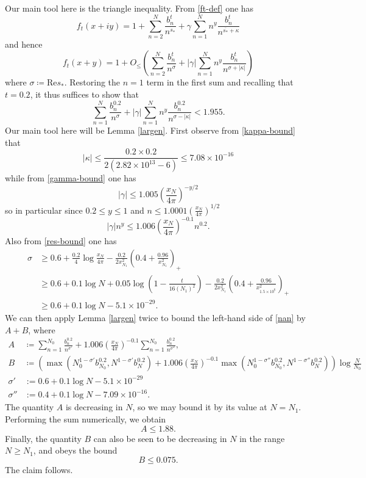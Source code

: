 Our main tool here is the triangle inequality.  From \eqref{ft-def} one has
$$
f_t(x+iy) = 1 + \sum_{n=2}^N \frac{b_n^t}{n^{s_*}} + \gamma \sum_{n=1}^N n^y \frac{b_n^t}{n^{\overline{s_*} + \kappa}}$$
and hence
$$ f_t(x+y) = 1 + O_{\leq}( \sum_{n=2}^N \frac{b_n^t}{n^{\sigma}} + |\gamma| \sum_{n=1}^N n^y \frac{b_n^t}{n^{\sigma + |\kappa|}} )$$
where $\sigma \coloneqq \mathrm{Re} s_*$.  Restoring the $n=1$ term in the first sum and recalling that $t=0.2$, it thus suffices to show that
\begin{equation}\label{nan}
 \sum_{n=1}^N \frac{b_n^{0.2}}{n^\sigma} + |\gamma| \sum_{n=1}^N n^y \frac{b_n^{0.2}}{n^{\sigma-|\kappa|}}
< 1.955.
\end{equation}
Our main tool here will be Lemma \ref{largen}.  First observe from \eqref{kappa-bound} that
$$ |\kappa| \leq \frac{0.2 \times 0.2}{2(2.82 \times 10^{13}-6)} \leq 7.08 \times 10^{-16}$$
while from \eqref{gamma-bound} one has
$$
|\gamma| \leq 1.005 \left( \frac{x_N}{4\pi} \right)^{-y/2}$$
so in particular since $0.2 \leq y \leq 1$ and $n \leq 1.0001 (\frac{x_N}{4\pi})^{1/2}$
$$
|\gamma| n^y \leq 1.006 \left( \frac{x_N}{4\pi} \right)^{-0.1} n^{0.2}.$$
Also from \eqref{res-bound} one has
\begin{align*}
\sigma &\geq 0.6 + \frac{0.2}{4} \log \frac{x_N}{4\pi} - \frac{0.2}{2x_{N_1}^2} \left(0.4+\frac{0.96}{x_{N_1}^2}\right)_+ \\
&\geq 0.6 + 0.1 \log N + 0.05 \log \left(1 - \frac{t}{16 (N_1)^2}\right) - \frac{0.2}{2x_{N_1}^2} \left(0.4+\frac{0.96}{x_{1.5\times 10^6}^2}\right)_+ \\
&\geq 0.6 + 0.1 \log N - 5.1 \times 10^{-29}.
\end{align*}
We can then apply Lemma \ref{largen} twice to bound the left-hand side of \eqref{nan} by $A+B$, where
\begin{align*}
A &\coloneqq \sum_{n=1}^{N_0} \frac{b_n^{0.2}}{n^{\sigma'}} + 1.006 \left( \frac{x_N}{4\pi} \right)^{-0.1} \sum_{n=1}^{N_0} \frac{b_n^{0.2}}{n^{\sigma''}}, \\
B &\coloneqq (\max( N_0^{1-\sigma'} b_{N_0}^{0.2}, N^{1-\sigma'} b_N^{0.2} ) + 1.006 \left( \frac{x_N}{4\pi} \right)^{-0.1} 
\max( N_0^{1-\sigma''} b_{N_0}^{0.2}, N^{1-\sigma''} b_N^{0.2} ) )\log \frac{N}{N_0} \\
\sigma' &:= 0.6 + 0.1 \log N - 5.1 \times 10^{-29} \\
\sigma'' &:= 0.4 + 0.1 \log N - 7.09 \times 10^{-16}.
\end{align*}
The quantity $A$ is decreasing in $N$, so we may bound it by its value at $N = N_1$.  Performing the sum numerically, we obtain
$$ A \leq 1.88.$$
Finally, the quantity $B$ can also be seen to be decreasing in $N$ in the range $N \geq N_1$, and obeys the bound
$$ B \leq 0.075.$$
The claim follows.

